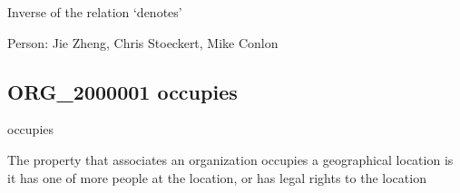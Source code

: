 \documentclass[letterpaper,10pt,english]{sphinxmanual}
\begin{document}
\begin{sphinxShadowBox}

\sphinxAtStartPar
Inverse of the relation ‘denotes’
\end{sphinxShadowBox}

\begin{sphinxShadowBox}

\sphinxAtStartPar
{}
\end{sphinxShadowBox}

\begin{sphinxShadowBox}

\sphinxAtStartPar
Person: Jie Zheng, Chris Stoeckert, Mike Conlon
\end{sphinxShadowBox}
\begin{quote}

\ignorespaces \end{quote}


\subsection{ORG\_2000001 \sphinxhyphen{} occupies}
\label{\detokenize{doc-ORG_2000001:org-2000001-occupies}}\label{\detokenize{doc-ORG_2000001:index-0}}\label{\detokenize{doc-ORG_2000001::doc}}
\begin{sphinxShadowBox}

\sphinxAtStartPar
occupies
\end{sphinxShadowBox}

\begin{sphinxShadowBox}

\sphinxAtStartPar
{}
\end{sphinxShadowBox}

\begin{sphinxShadowBox}

\sphinxAtStartPar
The property that associates an organization occupies a geographical location is it has one of more people at the location, or has legal rights to the location
\end{sphinxShadowBox}
\end{document}
